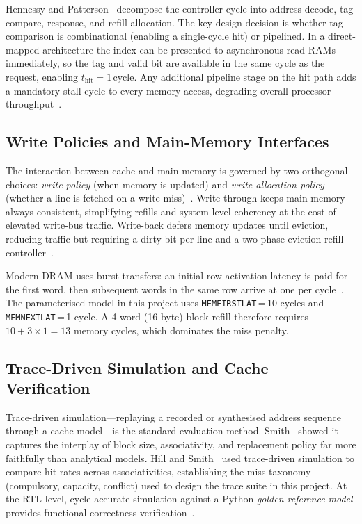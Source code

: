 \documentclass[conference]{IEEEtran}
\renewcommand{\_}{\textunderscore\allowbreak{}}
\begin{document}
Hennessy and Patterson~\cite{hennessy2017,patterson2020} decompose the
controller cycle into address decode, tag compare, response, and refill
allocation. The key design decision is whether tag comparison is
combinational (enabling a single-cycle hit) or pipelined. In a
direct-mapped architecture the index can be presented to asynchronous-read
RAMs immediately, so the tag and valid bit are available in the same cycle
as the request, enabling $t_{\mathrm{hit}} = 1\,\mathrm{cycle}$. Any
additional pipeline stage on the hit path adds a mandatory stall cycle to
every memory access, degrading overall processor throughput~\cite{hill1989}.

\subsection{Write Policies and Main-Memory Interfaces}
\label{sec:litrev-c}

The interaction between cache and main memory is governed by two orthogonal
choices: \emph{write policy} (when memory is updated) and
\emph{write-allocation policy} (whether a line is fetched on a write
miss)~\cite{smith1982,hennessy2017}. Write-through keeps main memory
always consistent, simplifying refills and system-level coherency at the
cost of elevated write-bus traffic. Write-back defers memory updates until
eviction, reducing traffic but requiring a dirty bit per line and a
two-phase eviction-refill controller~\cite{jouppi1990,patterson2020}.

Modern DRAM uses burst transfers: an initial row-activation latency is
paid for the first word, then subsequent words in the same row arrive at
one per cycle~\cite{hennessy2017}. The parameterised model in this project
uses \texttt{MEM\_FIRST\_LAT}\,=\,10 cycles and
\texttt{MEM\_NEXT\_LAT}\,=\,1 cycle. A 4-word (16-byte) block refill
therefore requires $10 + 3 \times 1 = 13$ memory cycles, which dominates
the miss penalty.

\subsection{Trace-Driven Simulation and Cache Verification}
\label{sec:litrev-d}

Trace-driven simulation---replaying a recorded or synthesised address
sequence through a cache model---is the standard evaluation method.
Smith~\cite{smith1982} showed it captures the interplay of block size,
associativity, and replacement policy far more faithfully than analytical
models. Hill and Smith~\cite{hill1989} used trace-driven simulation to
compare hit rates across associativities, establishing the miss
taxonomy (compulsory, capacity, conflict) used to design the trace suite
in this project. At the RTL level, cycle-accurate simulation against a
Python \emph{golden reference model} provides functional
correctness verification~\cite{patterson2020}.
\end{document}
